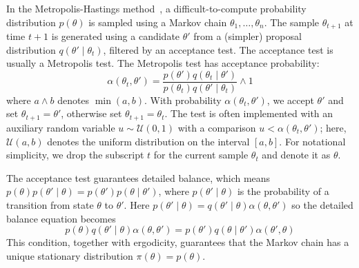 \documentclass[twoside]{article} \usepackage{aistats2017}
\begin{document}
In the Metropolis-Hastings method~\citep{gilks1996markov,brooks2011handbook}, a
difficult-to-compute probability distribution $p(\theta)$ is sampled using a
Markov chain $\theta_1,\ldots,\theta_n$. The sample $\theta_{t+1}$ at time $t+1$
is generated using a candidate $\theta'$ from a (simpler) proposal distribution
$q(\theta'\mid \theta_t)$, filtered by an acceptance test. The acceptance test
is usually a Metropolis test. The Metropolis test has acceptance probability:
\begin{equation}\label{eq:traditional}
    \alpha(\theta_t,\theta') = \frac{p(\theta')q(\theta_t \mid \theta')}{p(\theta_t)q(\theta' \mid \theta_t)} \wedge 1
\end{equation}
where $a \wedge b$ denotes $\min(a,b)$.  With probability
$\alpha(\theta_t,\theta')$, we accept $\theta'$ and set $\theta_{t+1} =
\theta'$, otherwise set $\theta_{t+1}=\theta_t$.  The test is often implemented
with an auxiliary random variable $u \sim \mathcal{U}(0,1)$ with a comparison
$u<\alpha(\theta_t,\theta')$; here, $\mathcal{U}(a,b)$ denotes the uniform
distribution on the interval $[a,b]$.  For notational simplicity, we drop the
subscript $t$ for the current sample $\theta_t$ and denote it as $\theta$. 

The acceptance test guarantees detailed balance, which means
$p(\theta)p(\theta'\mid\theta) = p(\theta')p(\theta \mid\theta')$,
where $p(\theta'\mid\theta)$ is the probability of a transition from state
$\theta$ to $\theta'$. Here $p(\theta'\mid\theta) =
q(\theta'\mid\theta)\alpha(\theta,\theta')$ so the detailed balance equation
becomes
\begin{equation}\label{eq:detailed_balance2}
    p(\theta)q(\theta'\mid\theta)\alpha(\theta,\theta') = p(\theta')q(\theta\mid\theta')\alpha(\theta',\theta)
\end{equation}
This condition, together with ergodicity, guarantees that the Markov chain has a
unique stationary distribution $\pi(\theta) = p(\theta)$.
\end{document}
